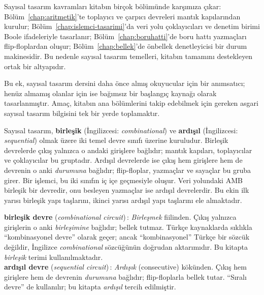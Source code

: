Sayısal tasarım kavramları kitabın birçok bölümünde karşımıza çıkar: Bölüm~\ref{chap:aritmetik}'te toplayıcı ve çarpıcı devreleri mantık kapılarından kurulur; Bölüm~\ref{chap:islemci-tasarimi}'da veri yolu çoklayıcıları ve denetim birimi Boole ifadeleriyle tasarlanır; Bölüm~\ref{chap:boruhatti}'de boru hattı yazmaçları flip-floplardan oluşur; Bölüm~\ref{chap:bellek}'de önbellek denetleyicisi bir durum makinesidir. Bu nedenle sayısal tasarım temelleri, kitabın tamamını destekleyen ortak bir altyapıdır.

Bu ek, sayısal tasarım dersini daha önce almış okuyucular için bir anımsatıcı; henüz almamış olanlar için ise bağımsız bir başlangıç kaynağı olarak tasarlanmıştır. Amaç, kitabın ana bölümlerini takip edebilmek için gereken asgari sayısal tasarım bilgisini tek bir yerde toplamaktır.

Sayısal tasarım, \textbf{birleşik} (İngilizcesi: \textit{combinational}) ve \textbf{ardışıl} (İngilizcesi: \textit{sequential}) olmak üzere iki temel devre sınıfı üzerine kuruludur. Birleşik devrelerde çıkış yalnızca o andaki girişlere bağlıdır; mantık kapıları, toplayıcılar ve çoklayıcılar bu gruptadır. Ardışıl devrelerde ise çıkış hem girişlere hem de devrenin o anki \emph{durumuna} bağlıdır; flip-floplar, yazmaçlar ve sayaçlar bu gruba girer. Bir işlemci, bu iki sınıfın iç içe geçmesiyle oluşur. Veri yolundaki AMB birleşik bir devredir, onu besleyen yazmaçlar ise ardışıl devrelerdir. Bu ekin ilk yarısı birleşik yapı taşlarını, ikinci yarısı ardışıl yapı taşlarını ele almaktadır.

\begin{terimnotu}
\textbf{birleşik devre} (\emph{combinational circuit})\,: \emph{Birleşmek} fiilinden. Çıkış yalnızca girişlerin o anki \emph{birleşimine} bağlıdır; bellek tutmaz. Türkçe kaynaklarda sıklıkla ``kombinasyonel devre'' olarak geçer; ancak ``kombinasyonel'' Türkçe bir sözcük değildir, İngilizce \emph{combinational} sözcüğünün doğrudan aktarımıdır. Bu kitapta \emph{birleşik} terimi kullanılmaktadır.\\[4pt]
\textbf{ardışıl devre} (\emph{sequential circuit})\,: \emph{Ardışık} (consecutive) kökünden. Çıkış hem girişlere hem de devrenin \emph{durumuna} bağlıdır; flip-floplarla bellek tutar. ``Sıralı devre'' de kullanılır; bu kitapta \emph{ardışıl} tercih edilmiştir.
\end{terimnotu}

